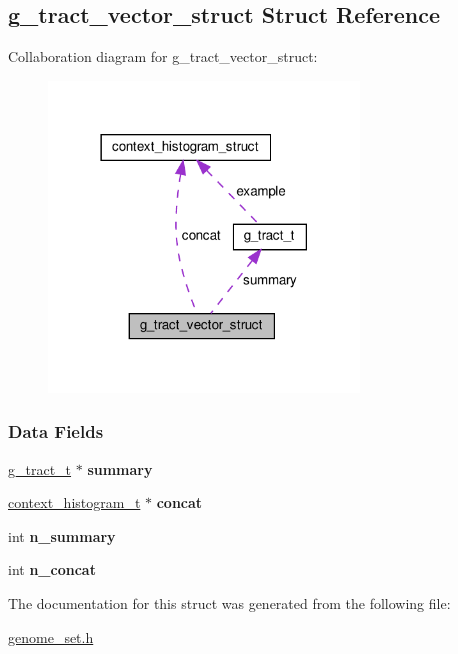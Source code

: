 \hypertarget{structg__tract__vector__struct}{}\subsection{g\+\_\+tract\+\_\+vector\+\_\+struct Struct Reference}
\label{structg__tract__vector__struct}


Collaboration diagram for g\+\_\+tract\+\_\+vector\+\_\+struct\+:\nopagebreak
\begin{figure}[H]
\begin{center}
\leavevmode
\includegraphics[width=234pt]{structg__tract__vector__struct__coll__graph}
\end{center}
\end{figure}
\subsubsection*{Data Fields}
\begin{DoxyCompactItemize}
\item 
\mbox{\label{structg__tract__vector__struct_a10037ff5d89b6f53b216d88a103ad5e3}} 
\hyperlink{structg__tract__t}{g\+\_\+tract\+\_\+t} $\ast$ {\bfseries summary}
\item 
\mbox{\label{structg__tract__vector__struct_af0712b1af3ee47f728366e1aef7e49a9}} 
\hyperlink{structcontext__histogram__struct}{context\+\_\+histogram\+\_\+t} $\ast$ {\bfseries concat}
\item 
\mbox{\label{structg__tract__vector__struct_afedcfa9a85da641f735827128d9217c9}} 
int {\bfseries n\+\_\+summary}
\item 
\mbox{\label{structg__tract__vector__struct_a90271ccb738cf5cfe6f5b732f4e5090a}} 
int {\bfseries n\+\_\+concat}
\end{DoxyCompactItemize}


The documentation for this struct was generated from the following file\+:\begin{DoxyCompactItemize}
\item 
\hyperlink{genome__set_8h}{genome\+\_\+set.\+h}\end{DoxyCompactItemize}
